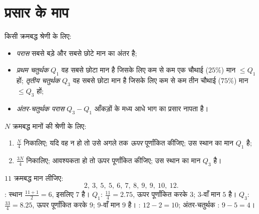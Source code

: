 \section{प्रसार के माप}

\begin{definition}[परास, चतुर्थक]\label{def:g10:stats:quartiles}
किसी क्रमबद्ध श्रेणी के लिए:
\begin{itemize}
  \item \emph{परास} सबसे बड़े और सबसे छोटे मान का अंतर है;
  \item \emph{प्रथम चतुर्थक} $Q_1$ वह सबसे छोटा मान है जिसके
        लिए कम से कम एक चौथाई ($25\%$) मान $\leq Q_1$ हों; \emph{तृतीय चतुर्थक}
        $Q_3$ वह सबसे छोटा मान है जिसके लिए कम से कम तीन चौथाई ($75\%$) मान
        $\leq Q_3$ हों;
  \item \emph{अंतर-चतुर्थक परास} $Q_3 - Q_1$ आँकड़ों के
        मध्य आधे भाग का प्रसार नापता है।
\end{itemize}
\end{definition}

\begin{method}[चतुर्थक ज्ञात करना]\label{met:g10:stats:quartiles}
$N$ क्रमबद्ध मानों की श्रेणी के लिए:
\begin{enumerate}
  \item $\frac N4$ निकालिए; यदि वह  न हो तो उसे अगले  तक
        \emph{ऊपर} पूर्णांकित कीजिए; उस स्थान का मान $Q_1$ है;
  \item $\frac{3N}{4}$ निकालिए; आवश्यकता हो तो ऊपर पूर्णांकित कीजिए; उस स्थान का मान
        $Q_3$ है।
\end{enumerate}
\end{method}

\begin{example}\label{ex:g10:stats:quartiles}
$11$ क्रमबद्ध मान लीजिए:
\[
2,\ 3,\ 5,\ 5,\ 6,\ 7,\ 8,\ 9,\ 9,\ 10,\ 12 .
\]
: स्थान $\frac{11+1}{2} = 6$, इसलिए  $7$ है।
$Q_1$: $\frac{11}{4} = 2.75$, ऊपर पूर्णांकित करके $3$; $3$-वाँ मान $5$ है।
$Q_3$: $\frac{33}{4} = 8.25$, ऊपर पूर्णांकित करके $9$; $9$-वाँ मान $9$ है।
: $12 - 2 = 10$; अंतर-चतुर्थक : $9 - 5 = 4$।
\end{example}

